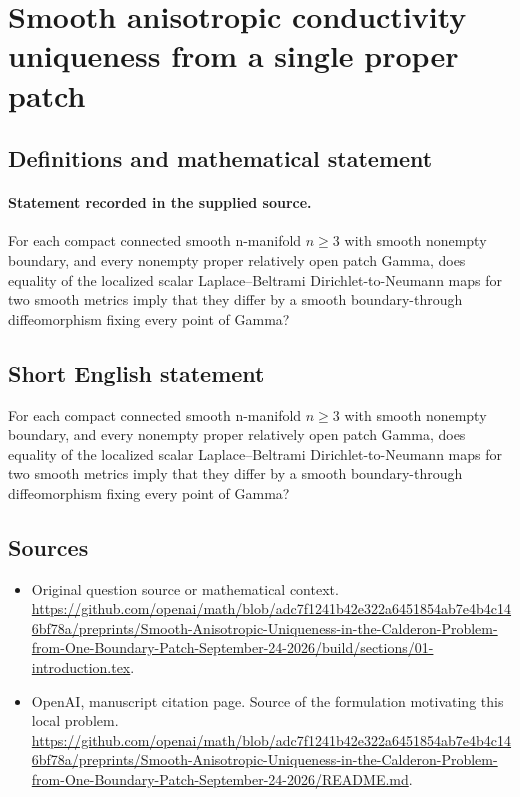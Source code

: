 \documentclass[11pt]{article}
\begin{document}
\section*{Smooth anisotropic conductivity uniqueness from a single proper patch}\label{30007336}
\subsection{Definitions and mathematical statement}
\paragraph{Statement recorded in the supplied source.}
For each compact connected smooth n-manifold $n\geq 3$ with smooth nonempty boundary, and every nonempty proper relatively open patch Gamma, does equality of the localized scalar Laplace–Beltrami Dirichlet-to-Neumann maps for two smooth metrics imply that they differ by a smooth boundary-through diffeomorphism fixing every point of Gamma?
\subsection{Short English statement}
For each compact connected smooth n-manifold $n\geq 3$ with smooth nonempty boundary, and every nonempty proper relatively open patch Gamma, does equality of the localized scalar Laplace–Beltrami Dirichlet-to-Neumann maps for two smooth metrics imply that they differ by a smooth boundary-through diffeomorphism fixing every point of Gamma?
\subsection{Sources}
\begin{itemize}
\item[S1] Original question source or mathematical context.
\url{https://github.com/openai/math/blob/adc7f1241b42e322a6451854ab7e4b4c146bf78a/preprints/Smooth-Anisotropic-Uniqueness-in-the-Calderon-Problem-from-One-Boundary-Patch-September-24-2026/build/sections/01-introduction.tex}.
\item[S2] OpenAI, manuscript citation page. Source of the formulation motivating this local problem.
\url{https://github.com/openai/math/blob/adc7f1241b42e322a6451854ab7e4b4c146bf78a/preprints/Smooth-Anisotropic-Uniqueness-in-the-Calderon-Problem-from-One-Boundary-Patch-September-24-2026/README.md}.
\end{itemize}
\end{document}
